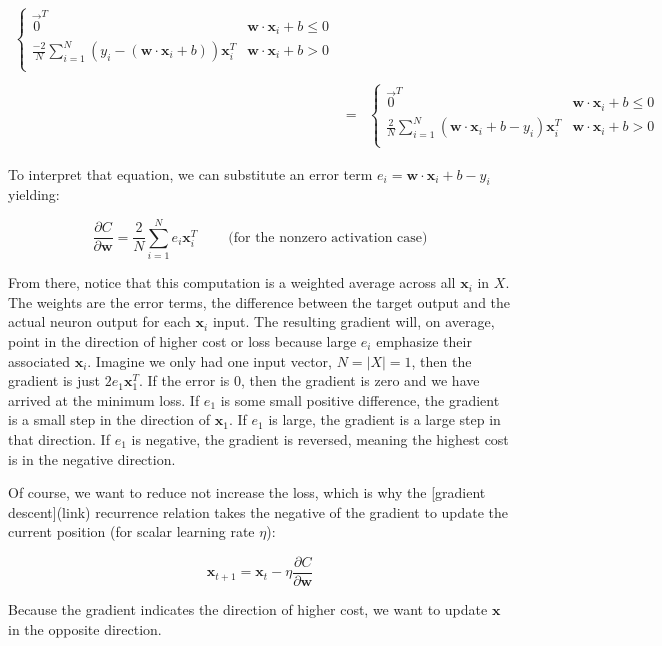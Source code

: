 \documentclass[11pt]{article}
\begin{document}
\begin{eqnarray*}
\begin{cases}
	\vec{0}^T & \mathbf{w} \cdot \mathbf{x}_i + b \leq 0\\
	\frac{-2}{N} \sum_{i=1}^N (y_i-(\mathbf{w}\cdot\mathbf{x}_i+b))\mathbf{x}_i^T & \mathbf{w} \cdot \mathbf{x}_i + b > 0\\
\end{cases}\\\\
 & = & \begin{cases}
	\vec{0}^T & \mathbf{w} \cdot \mathbf{x}_i + b \leq 0\\
	\frac{2}{N} \sum_{i=1}^N (\mathbf{w}\cdot\mathbf{x}_i+b-y_i)\mathbf{x}_i^T & \mathbf{w} \cdot \mathbf{x}_i + b > 0\\
\end{cases}
\end{eqnarray*}

To interpret that equation, we can substitute an error term $e_i = \mathbf{w}\cdot\mathbf{x}_i+b-y_i$ yielding:

\[
\frac{\partial C}{\partial \mathbf{w}} = \frac{2}{N} \sum_{i=1}^N e_i\mathbf{x}_i^T ~~~~~~~~~~\text{(for the nonzero activation case)}
\]

From there, notice that this computation is a weighted average across all $\mathbf{x}_i$ in $X$. The weights are the error terms, the difference between the target output and the actual neuron output for each $\mathbf{x}_i$ input. The resulting gradient will, on average, point in the direction of higher cost or loss because large $e_i$ emphasize their associated $\mathbf{x}_i$. Imagine we only had one input vector, $N=|X|=1$, then the gradient is just $2e_1\mathbf{x}_1^T$.  If the error is 0, then the gradient is zero and we have arrived at the minimum loss. If $e_1$ is some small positive difference, the gradient is a small step in the direction of $\mathbf{x}_1$. If $e_1$ is large, the gradient is a large step in that direction. If $e_1$ is negative, the gradient is reversed, meaning the highest cost is in the negative direction.

Of course, we want to reduce not increase the loss, which is why the [gradient descent](link) recurrence relation takes the negative of the gradient to update the current position (for scalar learning rate  $\eta$):

\[
\mathbf{x}_{t+1} = \mathbf{x}_{t} - \eta \frac{\partial C}{\partial \mathbf{w}}
\]

Because the gradient indicates the direction of higher cost, we want to update $\mathbf{x}$ in the opposite direction.
\end{document}
